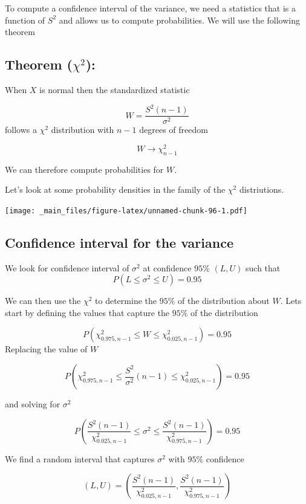 \documentclass[
]{book}
\begin{document}
To compute a confidence interval of the variance, we need a statistics that is a function of \(S^2\) and allows us to compute probabilities. We will use the following theorem

\hypertarget{theorem-chi2}{%
\subsection{\texorpdfstring{Theorem (\(\chi^2\)):}{Theorem (\textbackslash chi\^{}2):}}\label{theorem-chi2}}

When \(X\) is normal then the standardized statistic

\[W=\frac{S^2(n-1)}{\sigma^2}\]
follows a \(\chi^2\) distribution with \(n-1\) degrees of freedom

\[W \rightarrow \chi^2_{n-1}\]

We can therefore compute probabilities for \(W\).

Let's look at some probability densities in the family of the \(\chi^2\) distriutions.

\texttt{[image: \_main\_files/figure-latex/unnamed-chunk-96-1.pdf]}

\hypertarget{confidence-interval-for-the-variance-1}{%
\subsection{Confidence interval for the variance}\label{confidence-interval-for-the-variance-1}}

We look for confidence interval of \(\sigma^2\) at confidence \(95\%\) \((L,U)\) such that \[P(L \leq \sigma^2 \leq U)=0.95\]

We can then use the \(\chi^2\) to determine the \(95\%\) of the distribution about \(W\). Lets start by defining the values that capture the \(95\%\) of the distribution

\[P(\chi^2_{0.975,n-1} \leq W \leq \chi^2_{0.025,n-1})=0.95\]
Replacing the value of \(W\)

\[P(\chi^2_{0.975,n-1} \leq \frac{S^2}{\sigma^2}(n-1) \leq \chi^2_{0.025,n-1})=0.95\]

and solving for \(\sigma^2\)

\[P(\frac{S^2 (n-1)}{\chi^2_{0.025,n-1}}\leq \sigma^2 \leq \frac{S^2(n-1)}{\chi^2_{0.975,n-1}})=0.95\]

We find a random interval that captures \(\sigma^2\)
with \(95\%\) confidence

\[(L,U) = (\frac{S^2 (n-1)}{\chi^2_{0.025,n-1}},\frac{S^2(n-1)}{\chi^2_{0.975,n-1}})\]
\end{document}
